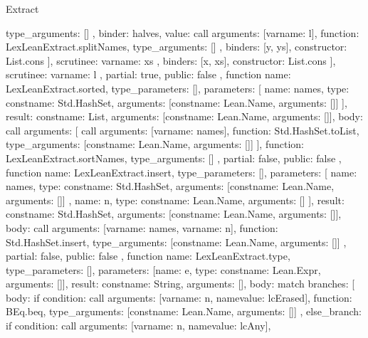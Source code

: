 \begin{lexlean}{Extract}
\begin{toolingmodule}
{{{{{{{{                      type_arguments: []
                    },
                    binder: halves,
                    value: call{
                      arguments: [var{name: l}],
                      function: LexLeanExtract.splitNames,
                      type_arguments: []
                    }
                  },
                  binders: [y, ys],
                  constructor: List.cons
                }
              ],
              scrutinee: var{name: xs}
            },
            binders: [x, xs],
            constructor: List.cons
          }
        ],
        scrutinee: var{name: l}
      },
      partial: true,
      public: false
    },
    function{
      name: LexLeanExtract.sorted,
      type_parameters: [],
      parameters: [
        {
          name: names,
          type: const{name: Std.HashSet, arguments: [const{name: Lean.Name, arguments: []}]}
        }
      ],
      result: const{name: List, arguments: [const{name: Lean.Name, arguments: []}]},
      body: call{
        arguments: [
          call{
            arguments: [var{name: names}],
            function: Std.HashSet.toList,
            type_arguments: [const{name: Lean.Name, arguments: []}]
          }
        ],
        function: LexLeanExtract.sortNames,
        type_arguments: []
      },
      partial: false,
      public: false
    },
    function{
      name: LexLeanExtract.insert,
      type_parameters: [],
      parameters: [
        {
          name: names,
          type: const{name: Std.HashSet, arguments: [const{name: Lean.Name, arguments: []}]}
        },
        {name: n, type: const{name: Lean.Name, arguments: []}}
      ],
      result: const{name: Std.HashSet, arguments: [const{name: Lean.Name, arguments: []}]},
      body: call{
        arguments: [var{name: names}, var{name: n}],
        function: Std.HashSet.insert,
        type_arguments: [const{name: Lean.Name, arguments: []}]
      },
      partial: false,
      public: false
    },
    function{
      name: LexLeanExtract.type,
      type_parameters: [],
      parameters: [{name: e, type: const{name: Lean.Expr, arguments: []}}],
      result: const{name: String, arguments: []},
      body: match{
        branches: [
          {
            body: if{
              condition: call{
                arguments: [var{name: n}, name{value: lcErased}],
                function: BEq.beq,
                type_arguments: [const{name: Lean.Name, arguments: []}]
              },
              else_branch: if{
                condition: call{
                  arguments: [var{name: n}, name{value: lcAny}],
}}}}}}}
\end{toolingmodule}
\end{lexlean}
